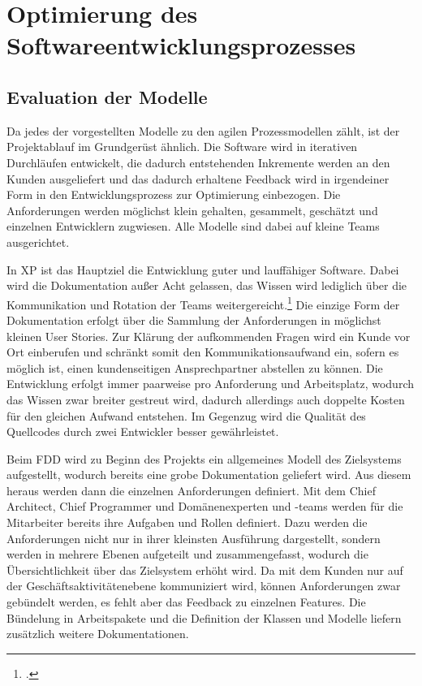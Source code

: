 \newpage
\section{Optimierung des Softwareentwicklungsprozesses}
\subsection{Evaluation der Modelle}
Da jedes der vorgestellten Modelle zu den agilen Prozessmodellen zählt, ist der Projektablauf im Grundgerüst ähnlich. Die Software wird in iterativen Durchläufen entwickelt, die dadurch entstehenden Inkremente werden an den Kunden ausgeliefert und das dadurch erhaltene Feedback wird in irgendeiner Form in den Entwicklungsprozess zur Optimierung einbezogen. Die Anforderungen werden möglichst klein gehalten, gesammelt, geschätzt und einzelnen Entwicklern zugwiesen. Alle Modelle sind dabei auf kleine Teams ausgerichtet.

In XP ist das Hauptziel die Entwicklung guter und lauffähiger Software. Dabei wird die Dokumentation außer Acht gelassen, das Wissen wird lediglich über die Kommunikation und Rotation der Teams weitergereicht.\footcite[Vgl.][Seite 168]{cockburn} Die einzige Form der Dokumentation erfolgt über die Sammlung der Anforderungen in möglichst kleinen User Stories. Zur Klärung der aufkommenden Fragen wird ein Kunde vor Ort einberufen und schränkt somit den Kommunikationsaufwand ein, sofern es möglich ist, einen kundenseitigen Ansprechpartner abstellen zu können. Die Entwicklung erfolgt immer paarweise pro Anforderung und Arbeitsplatz, wodurch das Wissen zwar breiter gestreut wird, dadurch allerdings auch doppelte Kosten für den gleichen Aufwand entstehen. Im Gegenzug wird die Qualität des Quellcodes durch zwei Entwickler besser gewährleistet.

Beim FDD wird zu Beginn des Projekts ein allgemeines Modell des Zielsystems aufgestellt, wodurch bereits eine grobe Dokumentation geliefert wird. Aus diesem heraus werden dann die einzelnen Anforderungen definiert. Mit dem Chief Architect, Chief Programmer und Domänenexperten und -teams werden für die Mitarbeiter bereits ihre Aufgaben und Rollen definiert. Dazu werden die Anforderungen nicht nur in ihrer kleinsten Ausführung dargestellt, sondern werden in mehrere Ebenen aufgeteilt und zusammengefasst, wodurch die Übersichtlichkeit über das Zielsystem erhöht wird. Da mit dem Kunden nur auf der Geschäftsaktivitätenebene kommuniziert wird, können Anforderungen zwar gebündelt werden, es fehlt aber das Feedback zu einzelnen Features. Die Bündelung in Arbeitspakete und die Definition der Klassen und Modelle liefern zusätzlich weitere Dokumentationen.


